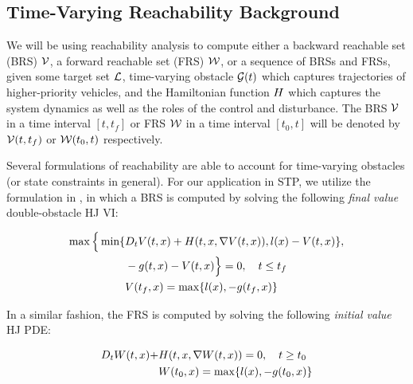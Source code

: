 \subsection{Time-Varying Reachability Background \label{sec:HJIVI}}
We will be using reachability analysis to compute either a backward reachable set (BRS) $\mathcal{V}$, a forward reachable set (FRS) $\mathcal{W}$, or a sequence of BRSs and FRSs, given some target set $\mathcal{L}$, time-varying obstacle $\mathcal{G}(t)$ which captures trajectories of higher-priority vehicles, and the Hamiltonian function $H$ which captures the system dynamics as well as the roles of the control and disturbance. The BRS $\mathcal{V}$ in a time interval $[t, t_f]$ or FRS $\mathcal{W}$ in a time interval $[t_0, t]$ will be denoted by $\mathcal{V}(t, t_f)$ or $\mathcal{W}(t_0, t)$ respectively. 

Several formulations of reachability are able to account for time-varying obstacles \cite{Bokanowski11, Fisac15} (or state constraints in general). For our application in STP, we utilize the formulation in \cite{Fisac15}, in which a BRS is computed by solving the following \textit{final value} double-obstacle HJ VI:

\begin{equation}
\label{eq:HJIVI_BRS}
\begin{aligned}
\max \Big\{ \min \{&D_t \valfunc(t, \state) + \ham(t, \state, \nabla \valfunc(t, \state)), \fc(\state) - \valfunc(t, \state) \}, \\
&-\obsfunc(t, \state) - \valfunc(t, \state) \Big\} = 0, \quad t \le t_f \\
&\valfunc(t_f, \state) = \max\{\fc(\state), -\obsfunc(t_f, \state)\}
\end{aligned}
\end{equation}

In a similar fashion, the FRS is computed by solving the following \textit{initial value} HJ PDE:

\begin{equation}
\label{eq:HJIVI_FRS}
\begin{aligned}
D_t \valfuncfwd(t, \state) + &\ham(t, \state, \nabla \valfuncfwd(t, \state)) = 0 , \quad t \ge t_0  \\
&\valfuncfwd(t_0, \state) = \max\{\fc(\state), -\obsfunc(t_0, \state)\}
\end{aligned}
\end{equation}

